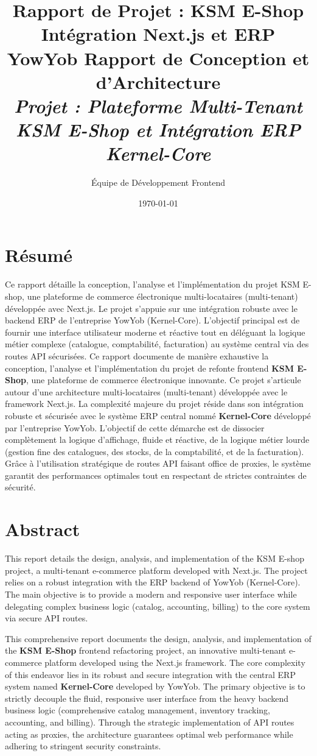 \documentclass[12pt, a4paper]{report}
\title{Rapport de Projet : KSM E-Shop \\ Intégration Next.js et ERP YowYob}
\author{}
\title{
    \vspace{2cm}
    \Huge \textbf{Rapport de Conception et d'Architecture}\\
    \vspace{0.5cm}
    \Large \textit{Projet : Plateforme Multi-Tenant KSM E-Shop et Intégration ERP Kernel-Core}\\
    \vspace{2cm}
}
\author{Équipe de Développement Frontend}
\date{\today}
\begin{document}
\maketitle
\tableofcontents
\newpage
\chapter*{Résumé}
Ce rapport détaille la conception, l'analyse et l'implémentation du projet KSM E-shop, une plateforme de commerce électronique multi-locataires (multi-tenant) développée avec Next.js. Le projet s'appuie sur une intégration robuste avec le backend ERP de l'entreprise YowYob (Kernel-Core). L'objectif principal est de fournir une interface utilisateur moderne et réactive tout en déléguant la logique métier complexe (catalogue, comptabilité, facturation) au système central via des routes API sécurisées.
\onehalfspacing
Ce rapport documente de manière exhaustive la conception, l'analyse et l'implémentation du projet de refonte frontend \textbf{KSM E-Shop}, une plateforme de commerce électronique innovante. Ce projet s'articule autour d'une architecture multi-locataires (multi-tenant) développée avec le framework Next.js. La complexité majeure du projet réside dans son intégration robuste et sécurisée avec le système ERP central nommé \textbf{Kernel-Core} développé par l'entreprise YowYob. L'objectif de cette démarche est de dissocier complètement la logique d'affichage, fluide et réactive, de la logique métier lourde (gestion fine des catalogues, des stocks, de la comptabilité, et de la facturation). Grâce à l'utilisation stratégique de routes API faisant office de proxies, le système garantit des performances optimales tout en respectant de strictes contraintes de sécurité.
\chapter*{Abstract}
This report details the design, analysis, and implementation of the KSM E-shop project, a multi-tenant e-commerce platform developed with Next.js. The project relies on a robust integration with the ERP backend of YowYob (Kernel-Core). The main objective is to provide a modern and responsive user interface while delegating complex business logic (catalog, accounting, billing) to the core system via secure API routes.

This comprehensive report documents the design, analysis, and implementation of the \textbf{KSM E-Shop} frontend refactoring project, an innovative multi-tenant e-commerce platform developed using the Next.js framework. The core complexity of this endeavor lies in its robust and secure integration with the central ERP system named \textbf{Kernel-Core} developed by YowYob. The primary objective is to strictly decouple the fluid, responsive user interface from the heavy backend business logic (comprehensive catalog management, inventory tracking, accounting, and billing). Through the strategic implementation of API routes acting as proxies, the architecture guarantees optimal web performance while adhering to stringent security constraints.
\end{document}
